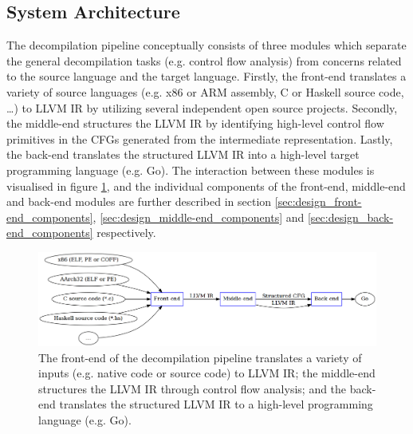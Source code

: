 


\subsection{System Architecture}
\label{sec:design_system_architecture}

The decompilation pipeline conceptually consists of three modules which separate the general decompilation tasks (e.g. control flow analysis) from concerns related to the source language and the target language. Firstly, the front-end translates a variety of source languages (e.g. x86 or ARM assembly, C or Haskell source code, …) to LLVM IR by utilizing several independent open source projects. Secondly, the middle-end structures the LLVM IR by identifying high-level control flow primitives in the CFGs generated from the intermediate representation. Lastly, the back-end translates the structured LLVM IR into a high-level target programming language (e.g. Go). The interaction between these modules is visualised in figure \ref{fig:decompilation_pipeline}, and the individual components of the front-end, middle-end and back-end modules are further described in section \ref{sec:design_front-end_components}, \ref{sec:design_middle-end_components} and \ref{sec:design_back-end_components} respectively.

\begin{figure}[htbp]
	\begin{center}
		\includegraphics[width=\textwidth]{inc/6_design/decompilation_pipeline.png}
		\caption{The front-end of the decompilation pipeline translates a variety of inputs (e.g. native code or source code) to LLVM IR; the middle-end structures the LLVM IR through control flow analysis; and the back-end translates the structured LLVM IR to a high-level programming language (e.g. Go).}
		\label{fig:decompilation_pipeline}
	\end{center}
\end{figure}

